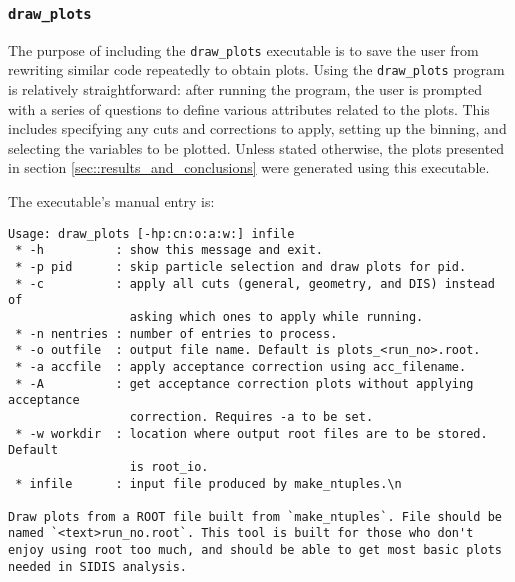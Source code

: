 \subsubsection{\texttt{draw\_plots}}
\label{sssec::draw_plots}
    The purpose of including the \texttt{draw\_plots} executable is to save the user from rewriting similar code repeatedly to obtain plots.
    Using the \texttt{draw\_plots} program is relatively straightforward: after running the program, the user is prompted with a series of questions to define various attributes related to the plots.
    This includes specifying any cuts and corrections to apply, setting up the binning, and selecting the variables to be plotted.
    Unless stated otherwise, the plots presented in section \ref{sec::results_and_conclusions} were generated using this executable.

    The executable's manual entry is:
    \begin{lstlisting}
Usage: draw_plots [-hp:cn:o:a:w:] infile
 * -h          : show this message and exit.
 * -p pid      : skip particle selection and draw plots for pid.
 * -c          : apply all cuts (general, geometry, and DIS) instead of
                 asking which ones to apply while running.
 * -n nentries : number of entries to process.
 * -o outfile  : output file name. Default is plots_<run_no>.root.
 * -a accfile  : apply acceptance correction using acc_filename.
 * -A          : get acceptance correction plots without applying acceptance
                 correction. Requires -a to be set.
 * -w workdir  : location where output root files are to be stored. Default
                 is root_io.
 * infile      : input file produced by make_ntuples.\n

Draw plots from a ROOT file built from `make_ntuples`. File should be named `<text>run_no.root`. This tool is built for those who don't enjoy using root too much, and should be able to get most basic plots needed in SIDIS analysis.
    \end{lstlisting}

